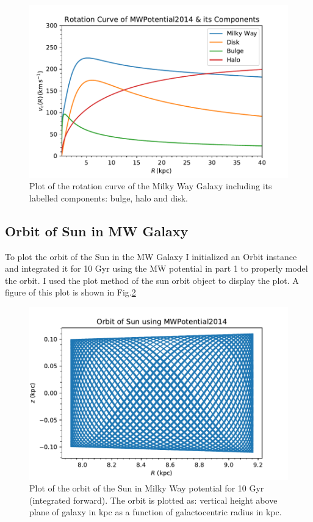 \documentclass[apj]{emulateapj}
\begin{document}
\begin{figure}
    \centering
    \includegraphics[width=1.0\columnwidth]{Q1a.pdf}
    \caption{Plot of the rotation curve of the Milky Way Galaxy including its labelled components: bulge, halo and disk.}
    \label{fig:Q1_rot_curve}
\end{figure}

\subsection{Orbit of Sun in MW Galaxy}
To plot the orbit of the Sun in the MW Galaxy I initialized an Orbit instance and integrated it for 10 Gyr using the MW potential in part 1 to properly model the orbit.
I used the plot method of the sun orbit object to display the plot. 
A figure of this plot is shown in Fig.\ref{fig:Q1_Sun}


\begin{figure}
    \centering
    \includegraphics[width=1.0\columnwidth]{Q1b.pdf}
    \caption{Plot of the orbit of the Sun in Milky Way potential for 10 Gyr (integrated forward). The orbit is plotted as: vertical height above plane of galaxy in kpc as a function of galactocentric radius in kpc.}
    \label{fig:Q1_Sun}
\end{figure}
\end{document}
